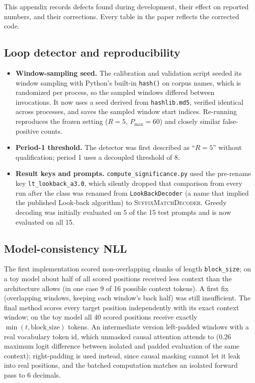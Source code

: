 \documentclass[11pt]{article}
\begin{document}
This appendix records defects found during development, their effect on reported numbers, and their corrections. Every table in the paper reflects the corrected code.

\subsection*{Loop detector and reproducibility}
\begin{itemize}[leftmargin=*]
  \item \textbf{Window-sampling seed.} The calibration and validation script seeded its window sampling with Python's built-in \texttt{hash()} on corpus names, which is randomized per process, so the sampled windows differed between invocations. It now uses a seed derived from \texttt{hashlib.md5}, verified identical across processes, and saves the sampled window start indices. Re-running reproduces the frozen setting ($R{=}5$, $P_{\max}{=}60$) and closely similar false-positive counts.
  \item \textbf{Period-1 threshold.} The detector was first described as ``$R{=}5$'' without qualification; period 1 uses a decoupled threshold of 8.
  \item \textbf{Result keys and prompts.} \texttt{compute\_\allowbreak{}significance.py} used the pre-rename key \texttt{lt\_lookback\_a3.0}, which silently dropped that comparison from every run after the class was renamed from \texttt{LookBackDecoder} (a name that implied the published Look-back algorithm) to \textsc{SuffixMatchDecoder}. Greedy decoding was initially evaluated on 5 of the 15 test prompts and is now evaluated on all 15.
\end{itemize}

\subsection*{Model-consistency NLL}
The first implementation scored non-overlapping chunks of length \texttt{block\_\allowbreak{}size}; on a toy model about half of all scored positions received less context than the architecture allows (in one case 9 of 16 possible context tokens). A first fix (overlapping windows, keeping each window's back half) was still insufficient. The final method scores every target position independently with its exact context window; on the toy model all 40 scored positions receive exactly $\min(t,\text{block\_size})$ tokens. An intermediate version left-padded windows with a real vocabulary token id, which unmasked causal attention attends to (0.26 maximum logit difference between isolated and padded evaluation of the same context); right-padding is used instead, since causal masking cannot let it leak into real positions, and the batched computation matches an isolated forward pass to 6 decimals.
\end{document}

